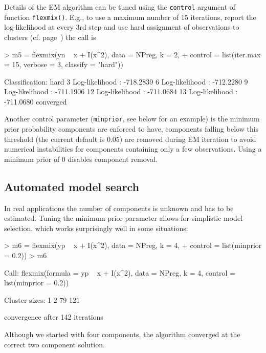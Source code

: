\documentclass{jss}
\begin{document}
Details of the EM algorithm can be tuned using the \texttt{control}
argument of function \texttt{flexmix()}. E.g., to use a maximum number
of 15 iterations, report the log-likelihood at every 3rd step and use hard
assignment of observations to clusters (cf. page~\pageref{hard}) the
call is

\begin{Schunk}
\begin{Sinput}
> m5 = flexmix(yn ~ x + I(x^2), data = NPreg, k = 2, 
+     control = list(iter.max = 15, verbose = 3, classify = "hard"))
\end{Sinput}
\begin{Soutput}
Classification: hard 
   3 Log-likelihood :    -718.2839 
   6 Log-likelihood :    -712.2280 
   9 Log-likelihood :    -711.1906 
  12 Log-likelihood :    -711.0684 
  13 Log-likelihood :    -711.0680 
converged
\end{Soutput}
\end{Schunk}

Another control parameter (\texttt{minprior}, see below for an
example) is the minimum prior probability components are enforced to
have, components falling below this threshold (the current default is
0.05) are removed during EM iteration to avoid numerical instabilities
for components containing only a few observations. Using a minimum
prior of 0 disables component removal.



\subsection{Automated model search}

In real applications the number of components is unknown and has to be
estimated.  Tuning the minimum prior parameter allows for 
simplistic model selection, which works surprisingly well in some situations:
\begin{Schunk}
\begin{Sinput}
> m6 = flexmix(yp ~ x + I(x^2), data = NPreg, k = 4, 
+     control = list(minprior = 0.2))
> m6
\end{Sinput}
\begin{Soutput}
Call:
flexmix(formula = yp ~ x + I(x^2), data = NPreg, 
    k = 4, control = list(minprior = 0.2))

Cluster sizes:
  1   2 
 79 121 

convergence after 142 iterations
\end{Soutput}
\end{Schunk}
Although we started with four components, the algorithm converged at
the correct two component solution.
\end{document}
